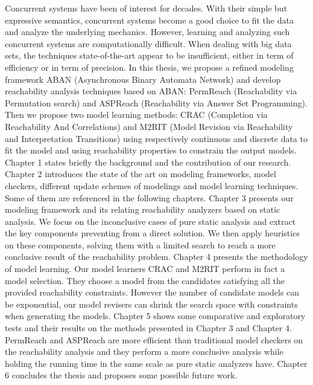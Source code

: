Concurrent systems have been of interest for decades. With their simple but expressive semantics, concurrent systems become a good choice to fit the data and analyze the underlying mechanics. However, learning and analyzing such concurrent systems are computationally difficult. When dealing with big data sets, the techniques state-of-the-art appear to be insufficient, either in term of efficiency or in term of precision.
In this thesis, we propose a refined modeling framework ABAN (Asynchronous Binary Automata Network) and develop reachability analysis techniques based on ABAN: PermReach (Reachability via Permutation search) and ASPReach (Reachability via Answer Set Programming). Then we propose two model learning methods: CRAC (Completion via Reachability And Correlations) and M2RIT (Model Revision via Reachability and Interpretation Transitions) using respectively continuous and discrete data to fit the model and using reachability properties to constrain the output models.
Chapter 1 states briefly the background and the contribution of our research.  Chapter 2 introduces the state of the art on modeling frameworks, model checkers, different update schemes of modelings and model learning techniques. Some of them are referenced in the following chapters.
Chapter 3 presents our modeling framework and its relating reachability analyzers based on static analysis. We focus on the inconclusive cases of pure static analysis and extract the key components preventing from a direct solution. We then apply heuristics on these components, solving them with a limited search to reach a more conclusive result of the reachability problem.
Chapter 4 presents the methodology of model learning.
Our model learners CRAC and M2RIT perform in fact a model selection.  They choose a model from the candidates satisfying all the provided reachability constraints. However the number of candidate models can be exponential, our model revisers can shrink the search space with constraints when generating the models.
Chapter 5 shows some comparative and exploratory tests and their results on the methods presented in Chapter 3 and Chapter 4. PermReach and ASPReach are more efficient than traditional model checkers on the reachability analysis and they perform a more conclusive analysis while holding the running time in the same scale as pure static analyzers have.
Chapter 6 concludes the thesis and proposes some possible future work.